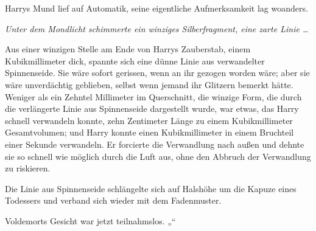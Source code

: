 Harrys Mund lief auf Automatik, seine eigentliche Aufmerksamkeit lag woanders.

\emph{Unter dem Mondlicht schimmerte ein winziges Silberfragment, eine zarte Linie …}

Aus einer winzigen Stelle am Ende von Harrys Zauberstab, einem Kubikmillimeter dick, spannte sich eine dünne Linie aus verwandelter Spinnenseide. Sie wäre sofort gerissen, wenn an ihr gezogen worden wäre; aber sie wäre unverdächtig geblieben, selbst wenn jemand ihr Glitzern bemerkt hätte. Weniger als ein Zehntel Millimeter im Querschnitt, die winzige Form, die durch die verlängerte Linie aus Spinnenseide dargestellt wurde, war etwas, das Harry schnell verwandeln konnte, zehn Zentimeter Länge zu einem Kubikmillimeter Gesamtvolumen; und Harry konnte einen Kubikmillimeter in einem Bruchteil einer Sekunde verwandeln. Er forcierte die Verwandlung nach außen und dehnte sie so schnell wie möglich durch die Luft aus, ohne den Abbruch der Verwandlung zu riskieren.

Die Linie aus Spinnenseide schlängelte sich auf Halshöhe um die Kapuze eines Todessers und verband sich wieder mit dem Fadenmuster.

Voldemorts Gesicht war jetzt teilnahmslos.
„“

